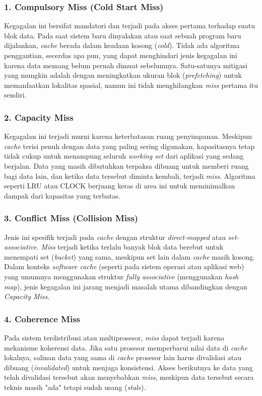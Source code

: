 \subsubsection{1. Compulsory Miss (Cold Start Miss)}
Kegagalan ini bersifat mandatori dan terjadi pada akses pertama
terhadap suatu blok data.
Pada saat sistem baru dinyalakan atau saat sebuah program baru
dijalankan, \textit{cache} berada dalam keadaan kosong (\textit{cold}).
Tidak ada algoritma penggantian, secerdas apa pun, yang dapat
menghindari jenis kegagalan ini karena data memang belum pernah
dimuat sebelumnya.
Satu-satunya mitigasi yang mungkin adalah dengan meningkatkan ukuran
blok (\textit{prefetching}) untuk memanfaatkan lokalitas spasial,
namun ini tidak menghilangkan \textit{miss} pertama itu sendiri.

\subsubsection{2. Capacity Miss}
Kegagalan ini terjadi murni karena keterbatasan ruang penyimpanan.
Meskipun \textit{cache} terisi penuh dengan data yang paling sering
digunakan, kapasitasnya tetap tidak cukup untuk menampung seluruh
\textit{working set} dari aplikasi yang sedang berjalan.
Data yang masih dibutuhkan terpaksa dibuang untuk memberi ruang bagi
data lain, dan ketika data tersebut diminta kembali, terjadi
\textit{miss}.
Algoritma seperti LRU atau CLOCK berjuang keras di area ini untuk
meminimalkan dampak dari kapasitas yang terbatas.

\subsubsection{3. Conflict Miss (Collision Miss)}
Jenis ini spesifik terjadi pada \textit{cache} dengan struktur
\textit{direct-mapped} atau \textit{set-associative}.
\textit{Miss} terjadi ketika terlalu banyak blok data berebut untuk
menempati set (\textit{bucket}) yang sama, meskipun set lain dalam
\textit{cache} masih kosong.
Dalam konteks \textit{software cache} (seperti pada sistem operasi
atau aplikasi web) yang umumnya menggunakan struktur \textit{fully
associative} (menggunakan \textit{hash map}), jenis kegagalan ini
jarang menjadi masalah utama dibandingkan dengan \textit{Capacity Miss}.

\subsubsection{4. Coherence Miss}
Pada sistem terdistribusi atau multiprosesor, \textit{miss} dapat
terjadi karena mekanisme koherensi data.
Jika satu prosesor memperbarui nilai data di \textit{cache}
lokalnya, salinan data yang sama di \textit{cache} prosesor lain
harus divalidasi atau dibuang (\textit{invalidated}) untuk menjaga
konsistensi.
Akses berikutnya ke data yang telah divalidasi tersebut akan
menyebabkan \textit{miss}, meskipun data tersebut secara teknis
masih "ada" tetapi sudah usang (\textit{stale}).

